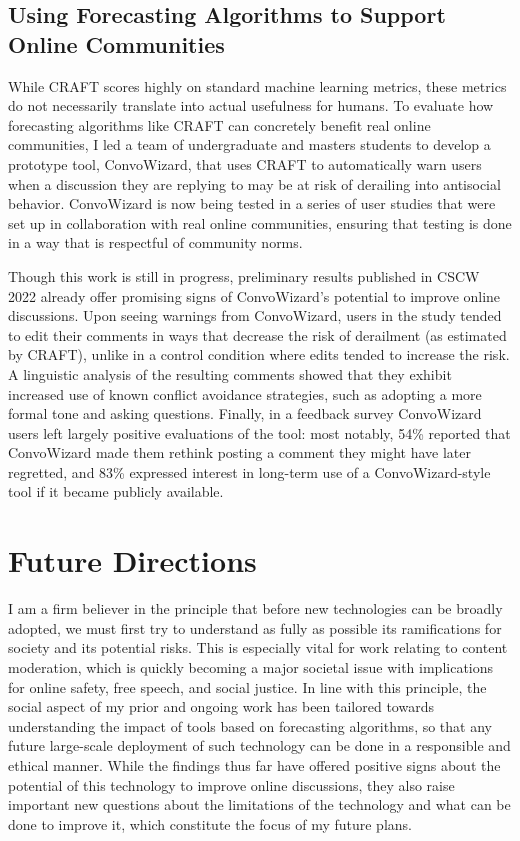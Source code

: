 \documentclass[12pt,letterpaper]{article}
\begin{document}
\subsection{Using Forecasting Algorithms to Support Online Communities}
While CRAFT scores highly on standard machine learning metrics, these metrics do not necessarily translate into actual usefulness for humans.
To evaluate how forecasting algorithms like CRAFT can concretely benefit real online communities, I led a team of undergraduate and masters students to develop a prototype tool, ConvoWizard, that uses CRAFT to automatically warn users when a discussion they are replying to may be at risk of derailing into antisocial behavior.
ConvoWizard is now being tested in a series of user studies that were set up in collaboration with real online communities, ensuring that testing is done in a way that is respectful of community norms.

Though this work is still in progress, preliminary results published in CSCW 2022 \cite{chang_thread_2022} already offer promising signs of ConvoWizard's potential to improve online discussions.
Upon seeing warnings from ConvoWizard, users in the study tended to edit their comments in ways that decrease the risk of derailment (as estimated by CRAFT), unlike in a control condition where edits tended to increase the risk.
A linguistic analysis of the resulting comments showed that they exhibit increased use of known conflict avoidance strategies, such as adopting a more formal tone and asking questions.
Finally, in a feedback survey ConvoWizard users left largely positive evaluations of the tool: most notably, 54\% reported that ConvoWizard made them rethink posting a comment they might have later regretted, and 83\% expressed interest in long-term use of a ConvoWizard-style tool if it became publicly available.

\section{Future Directions}
I am a firm believer in the principle that before new technologies can be broadly adopted, we must first try to understand as fully as possible its ramifications for society and its potential risks.
This is especially vital for work relating to content moderation, which is quickly becoming a major societal issue with implications for online safety, free speech, and social justice.
In line with this principle, the social aspect of my prior and ongoing work has been tailored towards understanding the impact of tools based on forecasting algorithms, so that any future large-scale deployment of such technology can be done in a responsible and ethical manner.
While the findings thus far have offered positive signs about the potential of this technology to improve online discussions, they also raise important new questions about the limitations of the technology and what can be done to improve it, which constitute the focus of my future plans.
\end{document}
